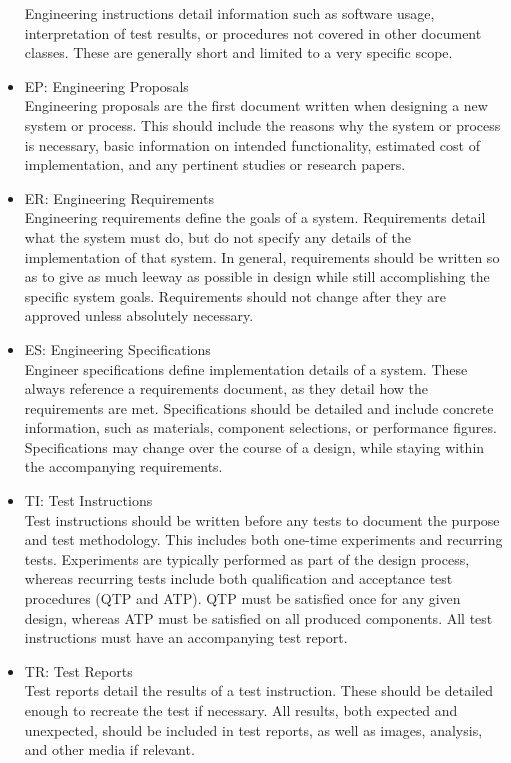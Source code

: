 \documentclass[12pt,article]{memoir}
\begin{document}
\begin{itemize}
Engineering instructions detail information such as software usage, interpretation of test results, or procedures not covered in other document classes. These are generally short and limited to a very specific scope.
\item EP: Engineering Proposals\\
Engineering proposals are the first document written when designing a new system or process. This should include the reasons why the system or process is necessary, basic information on intended functionality, estimated cost of implementation, and any pertinent studies or research papers.
\item ER: Engineering Requirements\\
Engineering requirements define the goals of a system. Requirements detail what the system must do, but do not specify any details of the implementation of that system. In general, requirements should be written so as to give as much leeway as possible in design while still accomplishing the specific system goals. Requirements should not change after they are approved unless absolutely necessary.
\item ES: Engineering Specifications\\
Engineer specifications define implementation details of a system. These always reference a requirements document, as they detail how the requirements are met. Specifications should be detailed and include concrete information, such as materials, component selections, or performance figures. Specifications may change over the course of a design, while staying within the accompanying requirements.
\item TI: Test Instructions\\
Test instructions should be written before any tests to document the purpose and test methodology. This includes both one-time experiments and recurring tests. Experiments are typically performed as part of the design process, whereas recurring tests include both qualification and acceptance test procedures (QTP and ATP). QTP must be satisfied once for any given design, whereas ATP must be satisfied on all produced components. All test instructions must have an accompanying test report.
\item TR: Test Reports\\
Test reports detail the results of a test instruction. These should be detailed enough to recreate the test if necessary. All results, both expected and unexpected, should be included in test reports, as well as images, analysis, and other media if relevant.
\end{itemize}
\end{document}
